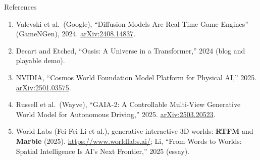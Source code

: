 \begin{frame}[allowframebreaks]{References}
\begin{enumerate}
    \item Valevski et al.\ (Google), ``Diffusion Models Are Real-Time Game Engines'' (GameNGen), 2024. \href{https://arxiv.org/abs/2408.14837}{arXiv:2408.14837}.
    \item Decart and Etched, ``Oasis: A Universe in a Transformer,'' 2024 (blog and playable demo).
    \item NVIDIA, ``Cosmos World Foundation Model Platform for Physical AI,'' 2025. \href{https://arxiv.org/abs/2501.03575}{arXiv:2501.03575}.
    \item Russell et al.\ (Wayve), ``GAIA-2: A Controllable Multi-View Generative World Model for Autonomous Driving,'' 2025. \href{https://arxiv.org/abs/2503.20523}{arXiv:2503.20523}.
    \item World Labs (Fei-Fei Li et al.), generative interactive 3D worlds: \textbf{RTFM} and \textbf{Marble} (2025). \url{https://www.worldlabs.ai/}; Li, ``From Words to Worlds: Spatial Intelligence Is AI's Next Frontier,'' 2025 (essay).
  \end{enumerate}
\end{frame}
